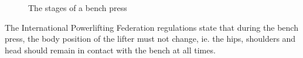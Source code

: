 \begin{figure}[H]
    \centering
\caption{The stages of a bench press}
\label{fig:bench_stages}
\end{figure}

The International Powerlifting Federation regulations\cite{ipf} state that during the bench press, the body position of the lifter must not change, ie. the hips, shoulders and head should remain in contact with the bench at all times.